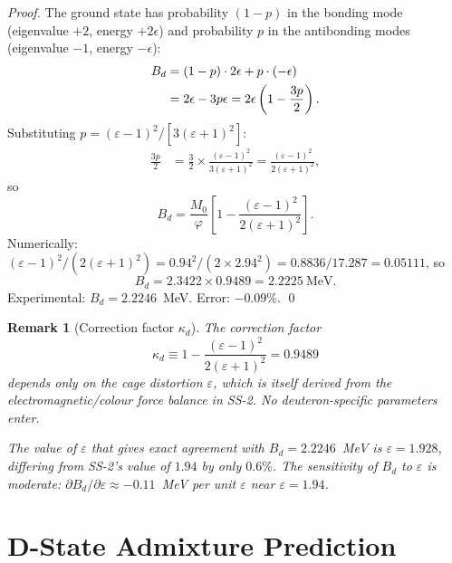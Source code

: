 \documentclass[11pt,letterpaper]{article}
\newtheorem{remark}[theorem]{Remark}
\newcommand{\phig}{\varphi}
\newcommand{\Mzero}{M_0}
\newcommand{\Bd}{B_d}
\newcommand{\epscage}{\varepsilon}
\newcommand{\kd}{\kappa_d}
\begin{document}
\begin{proof}
The ground state has probability $(1-p)$ in the bonding mode
(eigenvalue $+2$, energy $+2\epsilon$) and probability $p$
in the antibonding modes (eigenvalue $-1$, energy
$-\epsilon$):
\begin{align}
\Bd &= (1-p)\cdot 2\epsilon + p\cdot(-\epsilon)
\notag \\
&= 2\epsilon - 3p\epsilon
= 2\epsilon\left(1 - \frac{3p}{2}\right).
\label{eq:Bd_p}
\end{align}
Substituting $p = (\epscage - 1)^2/[3(\epscage+1)^2]$:
\begin{align}
\frac{3p}{2} &=
\frac{3}{2} \times
\frac{(\epscage-1)^2}{3(\epscage+1)^2}
= \frac{(\epscage-1)^2}{2(\epscage+1)^2},
\end{align}
so
\begin{equation}
\Bd = \frac{\Mzero}{\phig}
\left[1 - \frac{(\epscage-1)^2}{2(\epscage+1)^2}\right].
\end{equation}
Numerically:
$(\epscage - 1)^2/(2(\epscage+1)^2)
= 0.94^2/(2 \times 2.94^2)
= 0.8836/17.287
= 0.05111$,
so
\[
\Bd = 2.3422 \times 0.9489 = 2.2225~\text{MeV}.
\]
Experimental: $\Bd = 2.2246$~MeV.
Error: $-0.09\%$. \qed
\end{proof}

\begin{remark}[Correction factor $\kd$]
\label{rem:kappa}
The correction factor
\begin{equation}
\kd \equiv 1 - \frac{(\epscage-1)^2}{2(\epscage+1)^2}
= 0.9489
\end{equation}
depends only on the cage distortion $\epscage$, which is
itself derived from the electromagnetic/colour force balance
in SS-2.  No deuteron-specific parameters enter.

The value of $\epscage$ that gives \emph{exact} agreement
with $\Bd = 2.2246$~MeV is $\epscage = 1.928$, differing
from SS-2's value of $1.94$ by only $0.6\%$.  The
sensitivity of $\Bd$ to $\epscage$ is moderate:
$\partial\Bd/\partial\epscage \approx -0.11$~MeV per unit
$\epscage$ near $\epscage = 1.94$.
\end{remark}

\section{D-State Admixture Prediction}
\label{sec:Dstate}
\end{document}
